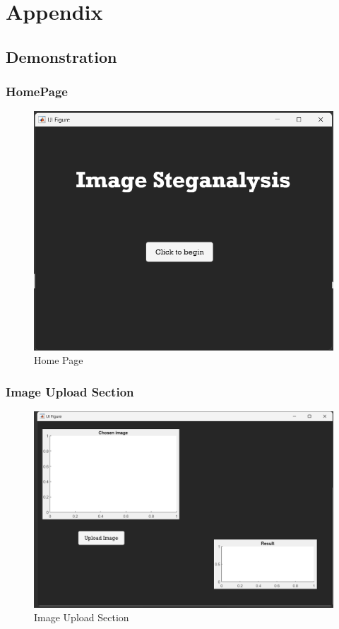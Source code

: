 \chapter*{Appendix}
\renewcommand{\thefigure}{A-\arabic{figure}}
\renewcommand{\thesection}{\Alph{section}}
\section{Demonstration}
\subsection{HomePage}
\begin{figure}[H]
    \centering
    \includegraphics[width=140mm]{./img/HomePage.png}
    \caption{Home Page}
\end{figure}

\subsection{Image Upload Section}
\begin{figure}[H]
    \centering
    \includegraphics[width=140mm]{./img/choose.png}
    \caption{Image Upload Section}
\end{figure}

